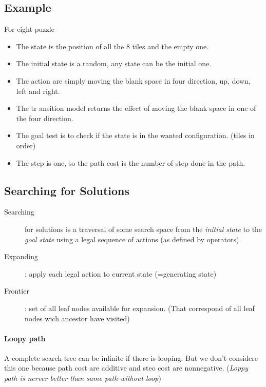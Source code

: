 \subsection{Example}
For eight puzzle
\begin{itemize}
\item The state is the position of all the 8 tiles and the empty one.
\item The initial state is a random, any state can be the initial one.
\item The action are simply moving the blank space in four direction, up, down, left and right.
\item The tr	ansition model returns the effect of moving the blank space in one of the four direction.
\item The goal test is to check if the state is in the wanted configuration. (tiles in order)
\item The step is one, so the path cost is the number of step done in the path.
\end{itemize}

\subsection{Searching for Solutions}

\begin{description}

    \item[Searching] for solutions  is a traversal of  some search space
    from the \textit{initial  state} to the \textit{goal  state} using a
    legal sequence of actions (as defined by operators).

    \item[Expanding]  :  apply  each   legal  action  to  current  state
    (=generating state)

    \item[Frontier] : set of all leaf nodes available for expansion. 
        (That correspond of all leaf nodes wich ancestor have visited)
\end{description}

\paragraph{Loopy path} A  complete search tree can be  infinite if there
is  looping. But  we  don't considere  this one  because  path cost  are
additive and  steo cost are  nonnegative. (\textit{Loppy path  is nerver
better than same path without loop})

